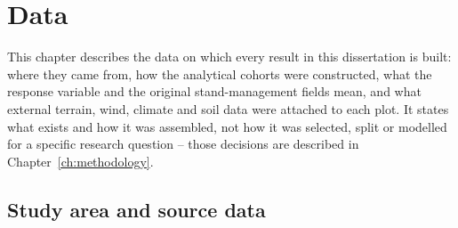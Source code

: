 %
%
\newcommand{\fc}[1]{\textcolor{red}{[FactC: #1]}}
\newcommand{\ct}[1]{\textcolor{orange}{[CITE: #1]}}
\newcommand{\app}[1]{\textcolor{blue}{[APP: #1]}}
\newcommand{\sr}[1]{\textcolor{teal}{[Reword: #1]}}

\chapter{Data}
\label{ch:data}

This chapter describes the data on which every result in this dissertation is built: where they
came from, how the analytical cohorts were constructed, what the response variable and the
original stand-management fields mean, and what external terrain, wind, climate and soil data
were attached to each plot. It states what exists and how it was assembled, not how it was
selected, split or modelled for a specific research question -- those decisions are described in
Chapter~\ref{ch:methodology}.

\section{Study area and source data}
\label{sec:data-source}

